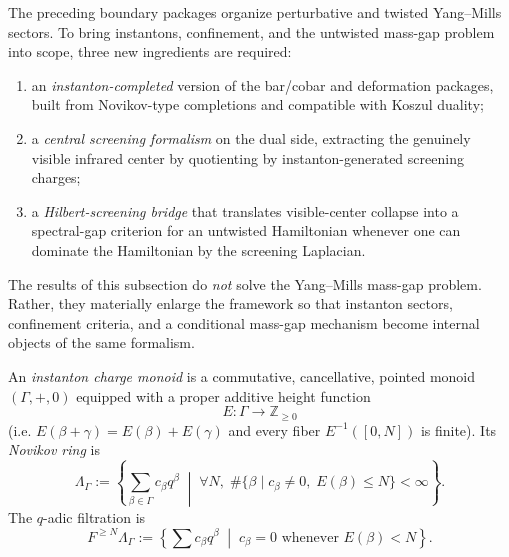 \begin{summary}
The preceding boundary packages organize perturbative and twisted Yang--Mills sectors.
To bring instantons, confinement, and the untwisted mass-gap problem into scope, three
new ingredients are required:
\begin{enumerate}[label=(\roman*)]
\item an \emph{instanton-completed} version of the bar/cobar and deformation packages, built from
Novikov-type completions and compatible with Koszul duality;
\item a \emph{central screening formalism} on the dual side, extracting the genuinely visible
infrared center by quotienting by instanton-generated screening charges;
\item a \emph{Hilbert-screening bridge} that translates visible-center collapse into a spectral-gap
criterion for an untwisted Hamiltonian whenever one can dominate the Hamiltonian by the screening
Laplacian.
\end{enumerate}
The results of this subsection do \emph{not} solve the Yang--Mills mass-gap problem.  Rather, they
materially enlarge the framework so that instanton sectors, confinement criteria, and a conditional
mass-gap mechanism become internal objects of the same formalism.
\end{summary}

\begin{definition}
\label{def:instanton-charge-monoid}
An \emph{instanton charge monoid} is a commutative, cancellative, pointed monoid
$(\Gamma,+,0)$ equipped with a proper additive height function
\[
E\colon \Gamma \longrightarrow \mathbb Z_{\ge 0}
\]
(i.e. $E(\beta+\gamma)=E(\beta)+E(\gamma)$ and every fiber $E^{-1}([0,N])$ is finite).
Its \emph{Novikov ring} is
\[
\Lambda_{\Gamma}
:=
\left\{\sum_{\beta\in\Gamma} c_{\beta} q^{\beta}
\;\middle|\;
\forall N,\; \#\{\beta\mid c_{\beta}\neq 0,\;E(\beta)\le N\}<\infty
\right\}.
\]
The $q$-adic filtration is
\[
F^{\ge N}\Lambda_{\Gamma}
:=
\left\{\sum c_{\beta}q^{\beta}\;\middle|\; c_{\beta}=0\text{ whenever }E(\beta)<N\right\}.
\]
\end{definition}

